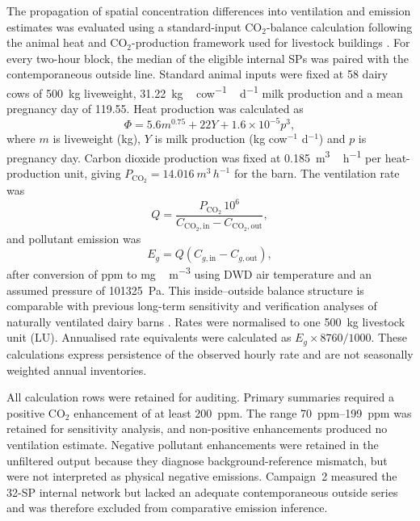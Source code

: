 \documentclass[12pt,a4paper]{article}
\begin{document}
The propagation of spatial concentration differences into ventilation and emission estimates was evaluated using a standard-input \(\mathrm{CO_2}\)-balance calculation following the animal heat and \(\mathrm{CO_2}\)-production framework used for livestock buildings \citep{Pedersen2008,VERA2018}. For every two-hour block, the median of the eligible internal SPs was paired with the contemporaneous outside line. Standard animal inputs were fixed at 58 dairy cows of \SI{500}{kg} liveweight, \SI{31.22}{kg\,cow^{-1}\,d^{-1}} milk production and a mean pregnancy day of 119.55. Heat production was calculated as
\begin{equation}
\Phi = 5.6m^{0.75}+22Y+1.6\times10^{-5}p^3,
\end{equation}
where \(m\) is liveweight (kg), \(Y\) is milk production (kg cow\(^{-1}\) d\(^{-1}\)) and \(p\) is pregnancy day. Carbon dioxide production was fixed at \SI{0.185}{m^3\,h^{-1}} per heat-production unit, giving \(P_{\mathrm{CO_2}}=\SI{14.016}{m^3\,h^{-1}}\) for the barn. The ventilation rate was
\begin{equation}
Q=\frac{P_{\mathrm{CO_2}}\,10^6}{C_{\mathrm{CO_2,in}}-C_{\mathrm{CO_2,out}}},
\end{equation}
and pollutant emission was
\begin{equation}
E_g=Q\left(C_{g,\mathrm{in}}-C_{g,\mathrm{out}}\right),
\end{equation}
after conversion of ppm to \si{mg\,m^{-3}} using DWD air temperature and an assumed pressure of \SI{101325}{Pa}. This inside--outside balance structure is comparable with previous long-term sensitivity and verification analyses of naturally ventilated dairy barns \citep{Koenig2018,JankeSampling2020,Janke2022,Declerck2025}. Rates were normalised to one \SI{500}{kg} livestock unit (LU). Annualised rate equivalents were calculated as \(E_g\times8760/1000\). These calculations express persistence of the observed hourly rate and are not seasonally weighted annual inventories.

All calculation rows were retained for auditing. Primary summaries required a positive \(\mathrm{CO_2}\) enhancement of at least \SI{200}{ppm}. The range \SIrange{70}{199}{ppm} was retained for sensitivity analysis, and non-positive enhancements produced no ventilation estimate. Negative pollutant enhancements were retained in the unfiltered output because they diagnose background-reference mismatch, but were not interpreted as physical negative emissions. Campaign~2 measured the 32-SP internal network but lacked an adequate contemporaneous outside series and was therefore excluded from comparative emission inference.
\end{document}
